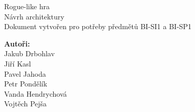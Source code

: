 \documentclass[12pt,a4paper]{article}
\begin{document}



\renewcommand{\headrulewidth}{0pt}
\renewcommand{\footrulewidth}{0pt}

\begin{titlepage}
  \thispagestyle{fancy}

	\vspace*{\fill}
	\begin{center}
    {\fontsize{28.83}{100}\selectfont Rogue-like hra}\\[0.6cm]
		{\fontsize{15.74}{40}\selectfont Návrh architektury}\\[1.5cm]
    {\fontsize{10}{10} \selectfont Dokument vytvořen pro potřeby předmětů
    BI-SI1 a BI-SP1}\\
	\end{center}

	\vspace*{\fill}

  {\fontsize{10}{10} \selectfont \noindent
\textbf{Autoři:}\\
  Jakub Drbohlav\\
  Jiří Kasl\\
  Pavel Jahoda\\
  Petr Pondělík\\
  Vanda Hendrychová\\
  Vojtěch Pejša\\
  }
\end{titlepage}

\newpage

\renewcommand{\headrulewidth}{0.4pt}
\renewcommand{\footrulewidth}{0.4pt}






\tableofcontents

\newpage

\end{document}
